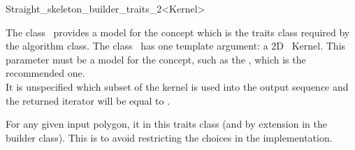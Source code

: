 

\begin{ccRefClass}{Straight_skeleton_builder_traits_2<Kernel>}


\ccDefinition

The class \ccRefName\ provides a model for the
 concept which is the traits class
required by the  algorithm class. The class 
\ccRefName\ has one template argument: a 2D \cgal\ Kernel. This parameter must be a model for the  concept, such as the , which is the recommended one.\\
It is unspecified which subset of the kernel is used into the output sequence and the returned iterator will be equal to .

For any given input polygon, it in this traits class (and by extension in the builder class). This is to avoid restricting the choices in the implementation.


\ccIsModel
{}\\
\\
\\

\ccSeeAlso
{}

\end{ccRefClass}



